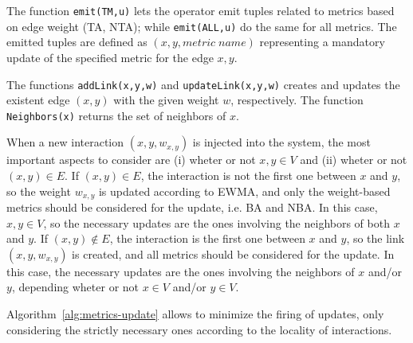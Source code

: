 
The function \texttt{emit(TM,u)} lets the operator emit tuples related to metrics based on edge weight (TA, NTA); while \texttt{emit(ALL,u)} do the same for all metrics.
%
The emitted tuples are defined as $(x,y,metric\; name)$ representing a mandatory update of the specified metric for the edge $x,y$.

The functions \texttt{addLink(x,y,w)} and  \texttt{updateLink(x,y,w)} creates and updates the existent edge $(x,y)$ with the given weight $w$, respectively.
%
The function \texttt{Neighbors(x)} returns the set of neighbors of $x$.

When a new interaction $(x,y,w_{x,y})$ is injected into the system, the most important aspects to consider are (i) wheter or not $x,y\in V$ and (ii) wheter or not $(x,y)\in E$.
%
If $(x,y)\in E$, the interaction is not the first one between $x$ and $y$, so the weight $w_{x,y}$ is updated according to EWMA, and only the weight-based metrics should be considered for the update, i.e. BA and NBA.
%
In this case, $x,y\in V$, so the necessary updates are the ones involving the neighbors of both $x$ and $y$.
%
If $(x,y)\notin E$, the interaction is the first one between $x$ and $y$, so the link $(x,y,w_{x,y})$ is created, and all metrics should be considered for the update.
%
In this case, the necessary updates are the ones involving the neighbors of $x$ and/or $y$, depending wheter or not $x\in V$ and/or $y\in V$.

Algorithm~\ref{alg:metrics-update} allows to minimize the firing of updates, only considering the strictly necessary ones according to the locality of interactions.
